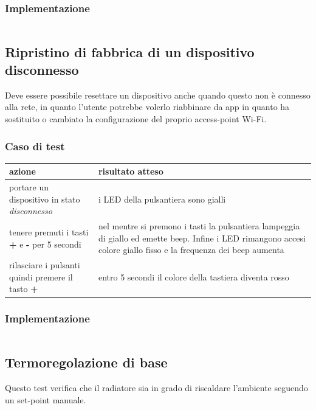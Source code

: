 \documentclass[12pt,a4paper,twoside,titlepage]{book}
\begin{document}
\subsubsection{Implementazione}
\inputminted{python3}{src/test_factory_reset.py}

\subsection{Ripristino di fabbrica di un dispositivo disconnesso}

Deve essere possibile resettare un dispositivo anche quando questo non è connesso
alla rete, in quanto l'utente potrebbe volerlo riabbinare da app in quanto ha sostituito
o cambiato la configurazione del proprio access-point Wi-Fi.

\subsubsection{Caso di test}
\begin{center}
\begin{tabular}{| p{} | p{} |}
    \hline \textbf{azione} & \textbf{risultato atteso} \\
    \hline portare un dispositivo in stato \textit{disconnesso} & i LED della pulsantiera sono gialli \\
    \hline tenere premuti i tasti \textbf{+} e \textbf{-} per 5 secondi & nel mentre si premono i tasti la pulsantiera lampeggia di giallo ed emette beep. Infine i LED rimangono accesi colore giallo fisso e la frequenza dei beep aumenta \\
    \hline rilasciare i pulsanti quindi premere il tasto \textbf{+} & entro 5 secondi il colore della tastiera diventa rosso \\
    \hline
\end{tabular}
\end{center}

\subsubsection{Implementazione}
\inputminted{python3}{src/test_factory_reset_unbounded.py}

\subsection{Termoregolazione di base}

Questo test verifica che il radiatore sia in grado di riscaldare l'ambiente seguendo un set-point manuale.
\end{document}
